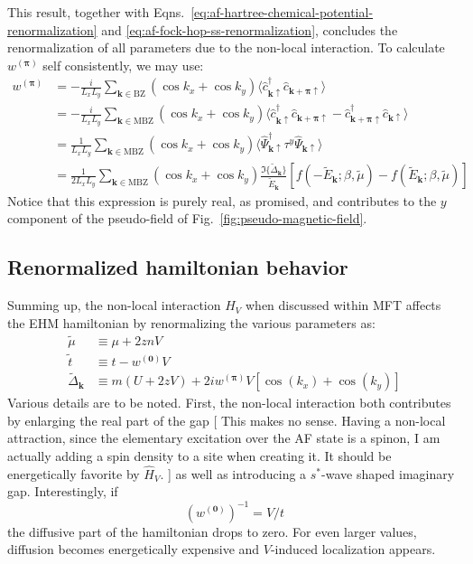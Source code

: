 This result, together with Eqns.~\eqref{eq:af-hartree-chemical-potential-renormalization} and \eqref{eq:af-fock-hop-ss-renormalization}, concludes the renormalization of all parameters due to the non-local interaction. To calculate $w^{(\bm{\pi})}$ self consistently, we may use:
\begin{align}
	w^{(\bm{\pi})} &= -\frac{i}{L_xL_y} \sum_{\mathbf{k}\in\mathrm{BZ}}
	\left(
		\cos k_x + \cos k_y
	\right) \langle
		\hat c_{\mathbf{k}\uparrow}^\dagger  \hat c_{\mathbf{k}+\bm{\pi}\uparrow}
	\rangle \nonumber \\
	&= -\frac{i}{L_xL_y} \sum_{\mathbf{k}\in\mathrm{MBZ}}
	\left(
		\cos k_x + \cos k_y
	\right) \langle
		\hat c_{\mathbf{k}\uparrow}^\dagger  \hat c_{\mathbf{k}+\bm{\pi}\uparrow} - \hat c_{\mathbf{k}+\bm{\pi}\uparrow}^\dagger  \hat c_{\mathbf{k}\uparrow}
	\rangle \nonumber  \\
	&= \frac{1}{L_xL_y} \sum_{\mathbf{k}\in\mathrm{MBZ}}
	\left(
	\cos k_x + \cos k_y
	\right) \langle
		\hat \Psi_{\mathbf{k}\uparrow}^\dagger \tau^y \hat \Psi_{\mathbf{k}\uparrow}
	\rangle \nonumber \\
	&= \frac{1}{2L_xL_y} \sum_{\mathbf{k}\in\mathrm{MBZ}}
	\left(
		\cos k_x + \cos k_y
	\right) \frac{\Im\{\tilde{\Delta}_\mathbf{k}\}}{\tilde{E}_\mathbf{k}} \left[
		f\left(
			-\tilde{E}_\mathbf{k};\beta,\tilde{\mu}
		\right) - f\left(
			\tilde{E}_\mathbf{k};\beta,\tilde{\mu}
		\right)
	\right] \label{eq:af-renormalized-self-consistent-equation-wpi}
\end{align}
Notice that this expression is purely real, as promised, and contributes to the $y$ component of the pseudo-field of Fig.~\ref{fig:pseudo-magnetic-field}.

\subsection{Renormalized hamiltonian behavior}

Summing up, the non-local interaction $\hat H_V$ when discussed within MFT affects the EHM hamiltonian by renormalizing the various parameters as:
\[
\begin{aligned}
	\tilde{\mu} &\equiv \mu + 2znV \\
	\tilde{t} &\equiv t - w^{(\mathbf{0})} V \\
	\tilde{\Delta}_\mathbf{k} &\equiv
	m(U + 2zV) + 2iw^{(\bm{\pi})}V
	\left[
		\cos \left(
			k_x
		\right)	+ \cos \left(
			k_y
		\right)	
	\right]
\end{aligned}
\]
Various details are to be noted. First, the non-local interaction both contributes by enlarging the real part of the gap {\color{tabred}[
	This makes no sense. Having a non-local attraction, since the elementary excitation over the AF state is a spinon, I am actually adding a spin density to a site when creating it. It should be energetically favorite by $\hat H_V$.
]} as well as introducing a $s^*$-wave shaped imaginary gap. Interestingly, if
\[
	\left(w^{(\mathbf{0})}\right)^{-1} = V/t
\]
the diffusive part of the hamiltonian drops to zero. For even larger values, diffusion becomes energetically expensive and $V$-induced localization appears.

